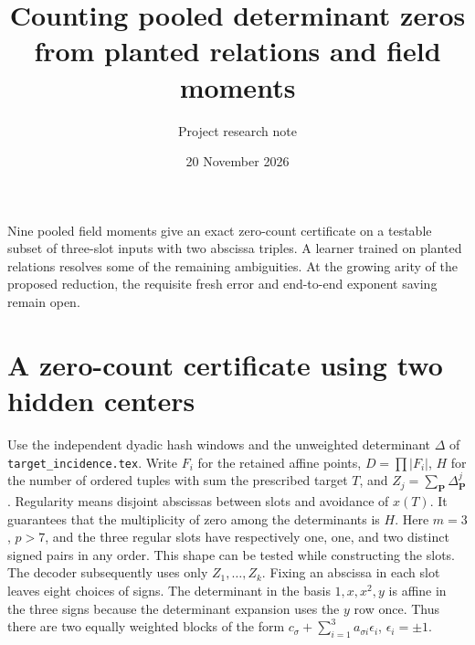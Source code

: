 \documentclass[11pt]{article}
\title{Counting pooled determinant zeros from planted relations and field moments}
\author{Project research note}
\date{20 November 2026}
\begin{document}
\maketitle

Nine pooled field moments give an exact zero-count certificate on a
testable subset of three-slot inputs with two abscissa triples. A learner
trained on planted relations resolves some of the remaining ambiguities.
At the growing arity of the proposed reduction, the requisite fresh error
and end-to-end exponent saving remain open.

\section{A zero-count certificate using two hidden centers}
Use the independent dyadic hash windows and the unweighted determinant
$\Delta$ of \texttt{target\_incidence.tex}. Write $F_i$ for the retained
affine points, $D=\prod|F_i|$, $H$ for the number of ordered tuples with
sum the prescribed target $T$, and $Z_j=\sum_{\mathbf P}\Delta_{\mathbf P}^j$.
Regularity means disjoint abscissas between slots and avoidance of $x(T)$.
It guarantees that the multiplicity of zero among the determinants is $H$.
Here $m=3$, $p>7$, and the three regular slots have respectively one, one,
and two distinct signed pairs in any order. This shape can be tested while
constructing the slots. The decoder subsequently uses only $Z_1,\ldots,Z_k$.
Fixing an abscissa in each slot leaves eight choices of signs. The determinant
in the basis $1,x,x^2,y$ is affine in the three signs because the determinant
expansion uses the $y$ row once. Thus there are two equally weighted blocks
of the form $c_\sigma+\sum_{i=1}^3 a_{\sigma i}\epsilon_i$, $\epsilon_i=\pm1$.
\end{document}

